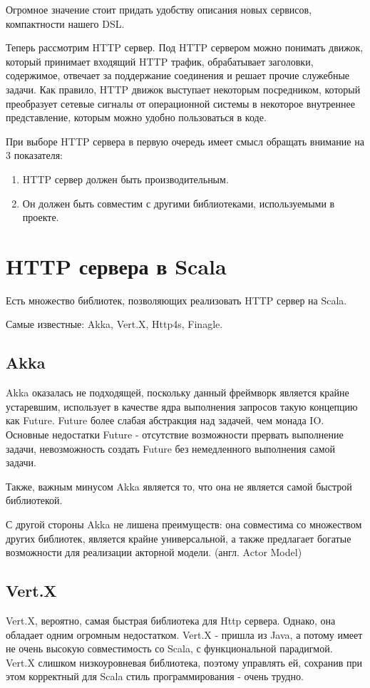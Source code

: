 \documentclass[14pt]{extarticle}
\begin{document}
    Огромное значение стоит придать удобству описания новых сервисов, компактности нашего DSL.

    Теперь рассмотрим HTTP сервер. Под HTTP сервером можно понимать движок, который принимает входящий HTTP трафик, обрабатывает заголовки, содержимое,
    отвечает за поддержание соединения и решает прочие служебные задачи. Как правило, HTTP движок выступает некоторым посредником,
    который преобразует сетевые сигналы от операционной системы в некоторое внутреннее представление, которым можно удобно пользоваться
    в коде.

    При выборе HTTP сервера в первую очередь имеет смысл обращать внимание на 3 показателя:

    \begin{enumerate}
        \item HTTP сервер должен быть производительным.
        \item Он должен быть совместим с другими библиотеками, используемыми в проекте.
    \end{enumerate}

    \section{HTTP сервера в Scala}

    Есть множество библиотек, позволяющих реализовать HTTP сервер на Scala.

    Самые известные: Akka, Vert.X, Http4s, Finagle.

    \subsection*{Akka\cite{akkahttp}}
    Akka оказалась не подходящей, поскольку данный фреймворк является крайне устаревшим, использует в качестве ядра выполнения
    запросов такую концепцию как Future. Future более слабая абстракция над задачей, чем монада IO.
    Основные недостатки Future - отсутствие возможности прервать выполнение задачи, невозможность создать Future без немедленного выполнения
    самой задачи.

    Также, важным минусом Akka является то, что она не является самой быстрой библиотекой.

    С другой стороны Akka не лишена преимуществ: она совместима со множеством других библиотек, является крайне
    универсальной, а также предлагает богатые возможности для реализации акторной модели. (англ. Actor Model)

    \subsection*{Vert.X\cite{vertx}}
    Vert.X, вероятно, самая быстрая библиотека для Http сервера. Однако, она обладает одним огромным недостатком.
    Vert.X - пришла из Java, а потому имеет не очень высокую совместимость со Scala, с функциональной парадигмой.
    Vert.X слишком низкоуровневая библиотека, поэтому управлять ей, сохранив при этом корректный для Scala стиль программирования - очень трудно.
\end{document}
